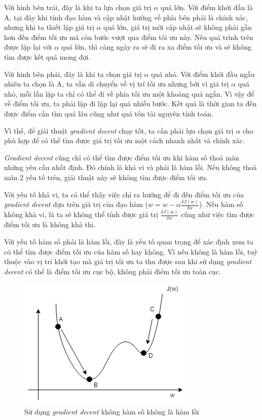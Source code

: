 Với hình bên trái, đây là khi ta lựa chọn giá trị $\alpha$ quá lớn. Với điểm khởi đầu là A, tại đây khi tính đạo hàm và cập nhật hướng về phía bên phải là chính xác, nhưng khi ta thiết lập giá trị $\alpha$ quá lớn, giá trị mới cập nhật sẽ không phải gần hơn đến điểm tối ưu mà còn bước vượt qua điểm tối ưu này. Nếu quá trình trên được lặp lại với $\alpha$ quá lớn, thì càng ngày ra sẽ đi ra xa điểm tối ưu và sẽ không tìm được kết quả mong đợi.

Với hình bên phải, đây là khi ta chọn giá trị $\alpha$ quá nhỏ. Với điểm khởi đầu ngẫu nhiên ta chọn là A, ta vẫn di chuyển về vị trí tối ưu nhưng bởi vì giá trị $\alpha$ quá nhỏ, mỗi lần lặp ta chỉ có thể đi về phía tối ưu một khoảng quá ngắn. Vì vậy để về điểm tối ưu, ta phải lặp đi lặp lại quá nhiều bước. Kết quả là thời gian ta đến được điểm cần tìm quá lâu cũng như quá tốn tài nguyên tính toán.

Vì thế, để giải thuật \textit{gradient decent} chạy tốt, ta cần phải lựa chọn giá trị $\alpha$ cho phù hợp để có thể tìm được giá trị tối ưu một cách nhanh nhất và chính xác.

\textit{Gradient decent} cũng chỉ có thể tìm được điểm tối ưu khi hàm số thoả mãn những yêu cầu nhất định. Đó chính là khả vi và phải là hàm lồi. Nếu không thoả mãn 2 yếu tố trên, giải thuật này sẽ không tìm được điểm tối ưu.

Với yếu tố khả vi, ta có thể thấy việc chỉ ra hướng để đi đến điểm tối ưu của \textit{gradient decent} dựa trên giá trị của đạo hàm ($w = w - \alpha\frac{\delta J(w)}{\delta w}$). Nếu hàm số không khả vi, là ta sẽ không thể tính được giá trị $\frac{\delta J(w)}{\delta w}$ cũng như việc tìm được điểm tối ưu là không khả thi.

Với yếu tố hàm số phải là hàm lồi, đây là yếu tố quan trọng để xác định xem ta có thể tìm được điểm tối ưu của hàm số hay không. Vì nếu không là hàm lồi, tuỳ thuộc vào vị trí khởi tạo mà giá trị tối ưu ta thu được sau khi sử dụng \textit{gradient decent} có thể là điểm tối ưu cục bộ, không phải điểm tối ưu toàn cục.

\begin{figure}[!h]
\centerline{\includegraphics{chapter02/figure/grad_5.png}}
\caption{Sử dụng \textit{
gradient decent} không hàm số không là hàm lồi}
\label{fig:grad_5}
\end{figure}

